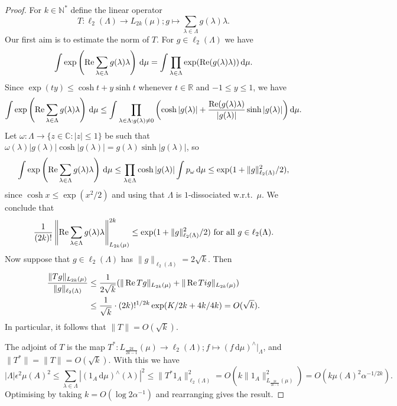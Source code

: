 \documentclass[12pt,reqno]{amsart}
\providecommand{\N}{\mathbb{N}}
\providecommand{\C}{\mathbb{C}}
\providecommand{\R}{\mathbb{R}}
\newcommand{\dd}{\,\mathrm{d}}
\renewcommand{\Re}{\mathop{\rm Re}\nolimits}
\numberwithin{equation}{section}
\begin{document}
\begin{proof}
For $k \in \N^*$ define the linear operator
\begin{equation*}
T:\ell_2(\Lambda) \rightarrow L_{2k}(\mu); g \mapsto \sum_{\lambda \in \Lambda}{g(\lambda)\lambda}.
\end{equation*}
Our first aim is to estimate the norm of $T$. For $g \in \ell_2(\Lambda)$ we have
\begin{equation*}
 \int{\exp\left(\Re \sum_{\lambda \in \Lambda}{g(\lambda)\lambda}\right)\dd\mu} = \int{\prod_{\lambda \in \Lambda}{\exp(\Re (g(\lambda)\lambda))}\dd\mu}.
\end{equation*}
Since $\exp(ty) \leq \cosh t + y \sinh t$ whenever $t \in \R$ and $-1 \leq y \leq 1$, we have
\begin{equation*}
\int{\exp\left(\Re\sum_{\lambda \in \Lambda}{g(\lambda)\lambda}\right)\dd\mu} \leq \int{\prod_{\lambda \in \Lambda: g(\lambda) \neq 0}{\left(\cosh |g(\lambda)| + \frac{\Re(g(\lambda)\lambda)}{|g(\lambda)|}\sinh |g(\lambda)|\right)}\dd\mu}.
\end{equation*}
Let $\omega:\Lambda \rightarrow \{z \in \C: |z| \leq 1\}$ be such that $\omega(\lambda)|g(\lambda)|\cosh |g(\lambda)|=g(\lambda)\sinh |g(\lambda)|$, so
\begin{equation*}
\int{\exp\left(\Re\sum_{\lambda \in \Lambda}{g(\lambda)\lambda}\right)\dd\mu} \leq \prod_{\lambda \in \Lambda}{\cosh |g(\lambda)|}\int{p_{\omega}\dd\mu} \leq  \exp(1+\|g\|_{\ell_2(\Lambda)}^2/2),
\end{equation*}
since $\cosh x \leq \exp(x^2/2)$ and using that $\Lambda$ is $1$-dissociated w.r.t.\ $\mu$. We conclude that
\begin{equation*}
\frac{1}{(2k)!}\left\|\Re\sum_{\lambda \in \Lambda}{g(\lambda)\lambda}\right\|_{L_{2k}(\mu)}^{2k}\leq  \exp(1+\|g\|_{\ell_2(\Lambda)}^2/2) \text{ for all }g \in \ell_2(\Lambda).
\end{equation*}
Now suppose that $g \in \ell_2(\Lambda)$ has $\|g\|_{\ell_2(\Lambda)}=2\sqrt{k}$. Then
\begin{align*}
\frac{\|Tg\|_{L_{2k}(\mu)}}{\|g\|_{\ell_2(\Lambda)}} & \leq \frac{1}{2\sqrt{k}}(\|\Re Tg\|_{L_{2k}(\mu)} +\|\Re Tig\|_{L_{2k}(\mu)})\\ & \leq \frac{1}{\sqrt{k}}\cdot (2k)!^{1/2k}\exp(K/2k+4k/4k)=O(\sqrt{k}).
\end{align*}
In particular, it follows that  $\|T\|=O(\sqrt{k})$.

The adjoint of $T$ is the map $T^*:L_{\frac{2k}{2k-1}}(\mu) \rightarrow \ell_2(\Lambda); f \mapsto (f\dd\mu)^\wedge|_\Lambda$, and $\|T^*\|=\|T\|=O(\sqrt{k})$. With this we have
\begin{equation*}
|\Lambda| \epsilon^2\mu(A)^2 \leq \sum_{\lambda \in\Lambda}{|(1_A\dd\mu)^\wedge(\lambda)|^2} \leq \|T^*1_A\|_{\ell_2(\Lambda)}^2 = O(k\|1_A\|_{L_{\frac{2k}{2k-1}}(\mu) }^2) =O(k\mu(A)^2\alpha^{-1/2k}).
\end{equation*}
Optimising by taking $k=O(\log2\alpha^{-1})$ and rearranging gives the result.
\end{proof}
\end{document}
